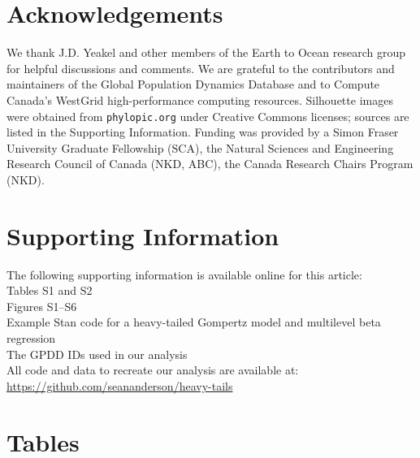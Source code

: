 \section{Acknowledgements}

We thank J.D. Yeakel and other members of the Earth to Ocean research
group for helpful discussions and comments. We are grateful to the
contributors and maintainers of the Global Population Dynamics Database and to
Compute Canada's WestGrid high-performance computing resources. Silhouette
images were obtained from \texttt{phylopic.org} under Creative Commons
licenses; sources are listed in the Supporting Information. Funding was
provided by a Simon Fraser University Graduate Fellowship (SCA), the Natural
Sciences and Engineering Research Council of Canada (NKD, ABC), the Canada
Research Chairs Program (NKD).

\section{Supporting Information}

The following supporting information is available online for this article:\\
Tables S1 and S2\\
Figures S1--S6\\
Example Stan code for a heavy-tailed Gompertz model and multilevel beta
regression\\
The GPDD IDs used in our analysis\\
All code and data to recreate our analysis are available at:\\
\url{https://github.com/seananderson/heavy-tails}



%

\clearpage

\section{Tables}



\clearpage

